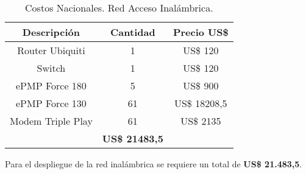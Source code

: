 \begin{table}[H]
  \scriptsize
  \centering
    \begin{tabular}{|c|c|c|}
    \hline
    \rowcolor[rgb]{ .718,  .871,  .91} \textbf{Descripción} & \textbf{Cantidad} & \textbf{Precio US\$} \bigstrut\\
    \hline
    Router Ubiquiti & 1     & US\$ 120 \bigstrut\\
    \hline
    Switch & 1     & US\$ 120 \bigstrut\\
    \hline
    ePMP Force 180 & 5     & US\$ 900 \bigstrut\\
    \hline
    ePMP Force 130 & 61    & US\$ 18208,5 \bigstrut\\
    \hline
    Modem Triple Play & 61    & US\$ 2135 \bigstrut\\
    \hline
    \rowcolor[rgb]{ .718,  .871,  .91} \multicolumn{2}{|c|}{\textbf{Total}} & \textbf{US\$ 21483,5} \bigstrut\\
    \hline
    \end{tabular}%
    \caption{Costos Nacionales. Red Acceso Inalámbrica.}
  \label{tab:costo-red-acceso}%
\end{table}%


Para el despliegue de la red inalámbrica se requiere un total de  \textbf{US\$ 21.483,5}.

\newpage






